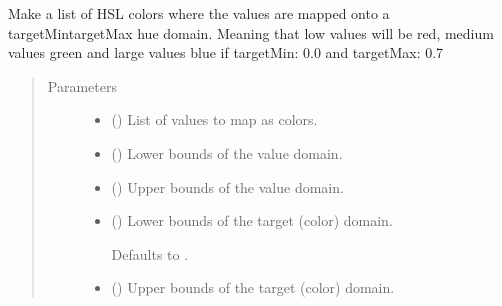 \documentclass[letterpaper,10pt,english]{sphinxmanual}
\begin{document}

\begin{fulllineitems}
\label{\detokenize{cockatoo:cockatoo.utilities.map_values_as_colors}}
Make a list of HSL colors where the values are mapped onto a
targetMin\sphinxhyphen{}targetMax hue domain. Meaning that low values will be red, medium
values green and large values blue if targetMin: 0.0 and targetMax: 0.7
\begin{quote}\begin{description}
\item[{Parameters}] \leavevmode\begin{itemize}
\item {} 
 () \textendash{} List of values to map as colors.

\item {} 
 () \textendash{} Lower bounds of the value domain.

\item {} 
 () \textendash{} Upper bounds of the value domain.

\item {} 
 (\sphinxstyleliteralemphasis{\sphinxupquote{, }}) \textendash{} 
Lower bounds of the target (color) domain.

Defaults to .


\item {} 
 (\sphinxstyleliteralemphasis{\sphinxupquote{, }}) \textendash{} 
Upper bounds of the target (color) domain.


\end{itemize}
\end{description}
\end{quote}
\end{fulllineitems}
\end{document}
